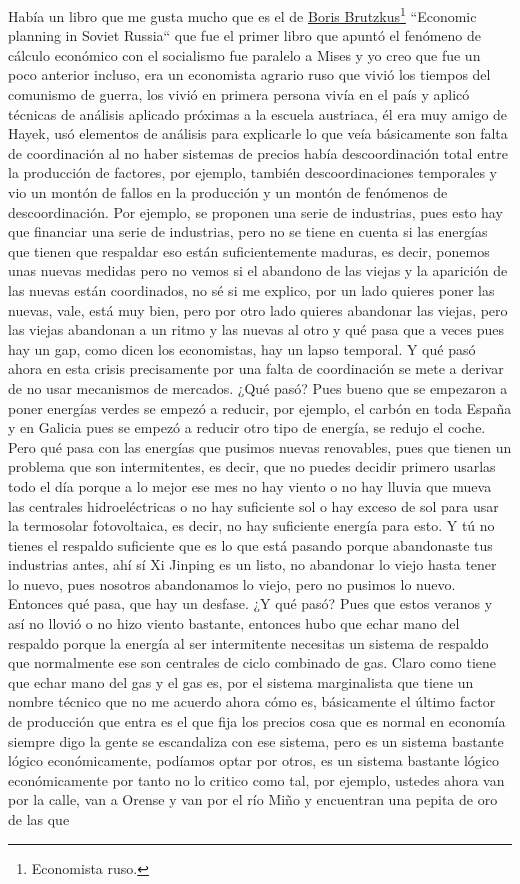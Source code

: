 Había un libro que me gusta mucho que es el de \href{Boris Brutzkus}{Boris Brutzkus}\footnote{Economista ruso.} ``Economic planning in Soviet Russia``\cite{brutzkus1982economic} que fue el primer libro que apuntó el fenómeno de cálculo económico con el socialismo fue paralelo a Mises y yo creo que fue un poco anterior incluso, era un economista agrario ruso que vivió los tiempos del comunismo de guerra, los vivió en primera persona vivía en el país y aplicó técnicas de análisis aplicado próximas a la escuela austriaca, él era muy amigo de Hayek, usó elementos de análisis para explicarle lo que veía básicamente son falta de coordinación al no haber sistemas de precios había descoordinación total entre la producción de factores, por ejemplo, también descoordinaciones temporales y vio un montón de fallos en la producción y un montón de fenómenos de descoordinación. Por ejemplo, se proponen una serie de industrias, pues esto hay que financiar una serie de industrias, pero no se tiene en cuenta si las energías que tienen que respaldar eso están suficientemente maduras, es decir, ponemos unas nuevas medidas pero no vemos si el abandono de las viejas y la aparición de las nuevas están coordinados, no sé si me explico, por un lado quieres poner las nuevas, vale, está muy bien, pero por otro lado quieres abandonar las viejas, pero las viejas abandonan a un ritmo y las nuevas al otro y qué pasa que a veces pues hay un gap, como dicen los economistas, hay un lapso temporal. Y qué pasó ahora en esta crisis precisamente por una falta de coordinación se mete a derivar de no usar mecanismos de mercados. ¿Qué pasó? Pues bueno que se empezaron a poner energías verdes se empezó a reducir, por ejemplo, el carbón en toda España y en Galicia pues se empezó a reducir otro tipo de energía, se redujo el coche. Pero qué pasa con las energías que pusimos nuevas renovables, pues que tienen un problema que son intermitentes, es decir, que no puedes decidir primero usarlas todo el día porque a lo mejor ese mes no hay viento o no hay lluvia que mueva las centrales hidroeléctricas o no hay suficiente sol o hay exceso de sol para usar la termosolar fotovoltaica, es decir, no hay suficiente energía para esto. Y tú no tienes el respaldo suficiente que es lo que está pasando porque abandonaste tus industrias antes, ahí sí Xi Jinping es un listo, no abandonar lo viejo hasta tener lo nuevo, pues nosotros abandonamos lo viejo, pero no pusimos lo nuevo. Entonces qué pasa, que hay un desfase. ¿Y qué pasó? Pues que estos veranos y así no llovió o no hizo viento bastante, entonces hubo que echar mano del respaldo porque la energía al ser intermitente necesitas un sistema de respaldo que normalmente ese son centrales de ciclo combinado de gas. Claro como tiene que echar mano del gas y el gas es, por el sistema marginalista que tiene un nombre técnico que no me acuerdo ahora cómo es, básicamente el último factor de producción que entra es el que fija los precios cosa que es normal en economía siempre digo la gente se escandaliza con ese sistema, pero es un sistema bastante lógico económicamente, podíamos optar por otros, es un sistema bastante lógico económicamente por tanto no lo critico como tal, por ejemplo, ustedes ahora van por la calle, van a Orense y van por el río Miño y encuentran una pepita de oro de las que 